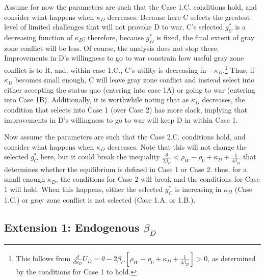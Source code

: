 \documentclass[
]{article}
\begin{document}
Assume for now the parameters are such that the Case 1.C. conditions hold, and consider what happens when \(\kappa_{D}\) decreases. Because here C selects the greatest level of limited challenges that will not provoke D to war, C's selected \(g_{C}^{*}\) is a decreasing function of \(\kappa_{D}\); therefore, because \(g_{D}^{*}\) is fixed, the final extent of gray zone conflict will be less. Of course, the analysis does not stop there. Improvements in D's willingness to go to war constrain how useful gray zone conflict is to R, and, within case 1.C., C's utility is decreasing in \(-\kappa_{D}\).\footnote{This follows from $\frac{d}{d\kappa_{D}}U_{D}=\theta-2\beta_{C}\left[\rho_{W}-\rho_{0}+\kappa_{D}+\frac{1}{4\beta_{D}}\right]>0$, as determined by the conditions for Case 1 to hold.} Thus, if \(\kappa_{D}\) becomes small enough, C will leave gray zone conflict and instead select into either accepting the status quo (entering into case 1A) or going to war (entering into Case 1B). Additionally, it is worthwhile noting that as \(\kappa_{D}\) decreases, the condition that selects into Case 1 (over Case 2) has more slack, implying that improvements in D's willingness to go to war will keep D in within Case 1.

Now assume the parameters are such that the Case 2.C. conditions hold, and consider what happens when \(\kappa_{D}\) decreases. Note that this will not change the selected \(g_{C}^{*}\) here, but it could break the inequality \(\frac{\theta}{2\beta_{C}}<\rho_{W}-\rho_{0}+\kappa_{D}+\frac{1}{4\beta_{D}}\) that determines whether the equilibrium is defined in Case 1 or Case 2. thus, for a small enough \(\kappa_{D}\), the conditions for Case 2 will break and the conditions for Case 1 will hold. When this happens, either the selected \(g_{C}^{*}\) is increasing in \(\kappa_{D}\) (Case 1.C.) or gray zone conflict is not selected (Case 1.A. or 1.B.).

\hypertarget{extension-1-endogenous-beta_d}{%
\subsection{\texorpdfstring{Extension 1: Endogenous \(\beta_{D}\)}{Extension 1: Endogenous \textbackslash beta\_\{D\}}}\label{extension-1-endogenous-beta_d}}
\end{document}
